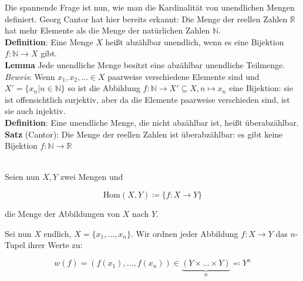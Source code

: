 \documentclass{article}
\begin{document}
Die spannende Frage ist nun, wie man die Kardinalität von unendlichen Mengen definiert.
Georg Cantor hat hier bereits erkannt: Die Menge der reellen Zahlen $\mathbb{R}$ hat mehr Elemente als
die Menge der natürlichen Zahlen $\mathbb{N}$. \\

\textbf{Definition}: Eine Menge $X$ heißt abzählbar unendlich, wenn es eine Bijektion
$f \colon \mathbb{N} \to X$ gibt.  \\

\textbf{Lemma} Jede unendliche Menge besitzt eine abzählbar unendliche Teilmenge. \\

\emph{Beweis}:  Wenn $x_1, x_2, \ldots \in X$ paarweise verschiedene Elemente sind und
$X' = \{ x_n | n \in \mathbb{N} \}$ so ist die Abbildung
$f \colon \mathbb{N} \to X' \subseteq{X}, n \mapsto x_n$ eine Bijektion: sie ist
offensichtlich surjektiv, aber da die Elemente paarweise verschieden sind, ist sie auch injektiv. \\

\textbf{Definition}: Eine unendliche Menge, die nicht abzählbar ist, heißt überabzählbar. \\

\textbf{Satz} (Cantor): Die Menge der reellen Zahlen ist überabzählbar: es gibt keine Bijektion
$f \colon \mathbb{N} \to \mathbb{R}$

\vspace{1mm} \\

Seien nun $X, Y$ zwei Mengen und

\[
  \text{Hom}(X, Y) \coloneqq \{ f \colon X \to Y \}
\]

die Menge der Abbildungen von $X$ nach $Y$.

Sei nun $X$ endlich, $X = \{ x_1, \ldots, x_n\}$. Wir ordnen jeder Abbildung $f \colon X \to Y$ das
$n$-Tupel ihrer Werte zu:

\[
  w(f) = (f(x_1), \ldots, f(x_n)) \in \underbrace{(Y \times \ldots \times Y)}_n \eqqcolon Y^n
\]
\end{document}
